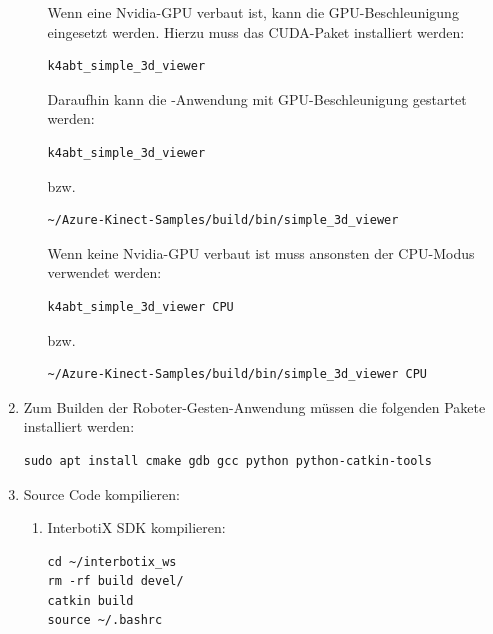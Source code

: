 \begin{enumerate}[label*=\arabic*.]
\begin{enumerate}[label*=\arabic*.]
                Wenn eine Nvidia-GPU verbaut ist, kann die GPU-Beschleunigung eingesetzt werden. Hierzu muss das CUDA-Paket installiert werden:
                \begin{lstlisting}[style=bash]
k4abt_simple_3d_viewer
                \end{lstlisting}

                Daraufhin kann die -Anwendung mit GPU-Beschleunigung gestartet werden:
                \begin{lstlisting}[style=bash]
k4abt_simple_3d_viewer
                \end{lstlisting}

                bzw.

                \begin{lstlisting}[style=bash]
~/Azure-Kinect-Samples/build/bin/simple_3d_viewer
                \end{lstlisting}

                Wenn keine Nvidia-GPU verbaut ist muss ansonsten der CPU-Modus verwendet werden:
                \begin{lstlisting}[style=bash]
k4abt_simple_3d_viewer CPU
                \end{lstlisting}

                bzw.

                \begin{lstlisting}[style=bash]
~/Azure-Kinect-Samples/build/bin/simple_3d_viewer CPU
                \end{lstlisting}
        \end{enumerate}

    \item Zum Builden der Roboter-Gesten-Anwendung müssen die folgenden Pakete installiert werden:
        \begin{lstlisting}[style=bash]
sudo apt install cmake gdb gcc python python-catkin-tools
        \end{lstlisting}

    \item Source Code kompilieren:
        \begin{enumerate}[label*=\arabic*.]
            \item InterbotiX SDK kompilieren:
                \begin{lstlisting}[style=bash]
cd ~/interbotix_ws
rm -rf build devel/
catkin build
source ~/.bashrc
                \end{lstlisting}


\end{enumerate}
\end{enumerate}
